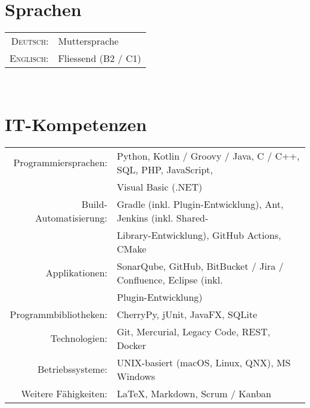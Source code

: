 \documentclass[10pt,a4paper]{article}
\begin{document}
\newpage


%
%
%
\nocite{*}
\printbibliography[title={Publikationen}]


\section{Sprachen}

\begin{tabular}{rl}
	\textsc{Deutsch:}		& Muttersprache \\
	\textsc{Englisch:}		& Fliessend (B2 / C1) \\
\end{tabular} \\


\section{IT-Kompetenzen}

\begin{tabular}{rl}
	Programmiersprachen:	& Python, Kotlin / Groovy / Java, C / C++, SQL, PHP, JavaScript, \\
						& Visual Basic (.NET) \\
	Build-Automatisierung:	& Gradle (inkl. Plugin-Entwicklung), Ant, Jenkins (inkl. Shared-\\
						& Library-Entwicklung), GitHub Actions, CMake \\
	Applikationen:			& SonarQube, GitHub, BitBucket / Jira / Confluence, Eclipse (inkl. \\
						& Plugin-Entwicklung) \\
	Programmbibliotheken:	& CherryPy, jUnit, JavaFX, SQLite \\
	Technologien:			& Git, Mercurial, Legacy Code, REST,  Docker \\
	Betriebssysteme:		& UNIX-basiert (macOS, Linux, QNX), MS Windows \\
	Weitere F\"ahigkeiten:	& {\fb \LaTeX}\setmainfont[SmallCapsFont=Fontin-SmallCaps.otf]{Fontin.otf}, Markdown, Scrum / Kanban \\
\end{tabular} \\
\end{document}
